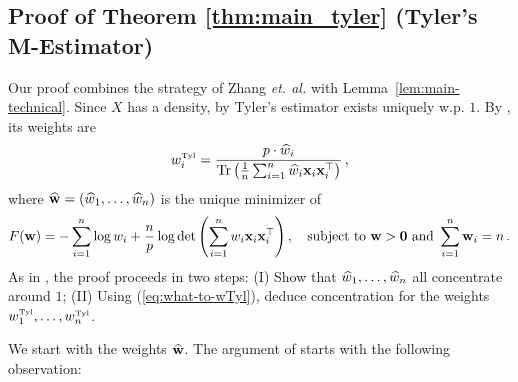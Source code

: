 \documentclass[times,sort&compress,3p]{elsarticle}
\begin{document}
   
\subsection{Proof of Theorem \ref{thm:main_tyler} (Tyler's M-Estimator)}
\label{sec:proof-Tyler}

Our proof combines the strategy of Zhang {\it et. al.} \cite{zhang2016marvcenko} with 
Lemma~\ref{lem:main-technical}.
Since $X$ has a density, by \cite[Theorems 1 and 2]{kent1988maximum} Tyler's estimator exists uniquely w.p. $1$. By \cite[Lemma 2.1]{zhang2016marvcenko}, its weights 
are
\begin{equation}\label{eq:what-to-wTyl}
    w^{\mbox{\tiny{Tyl}}}_i = \frac{p\cdot \widehat{w}_i}{\textrm{Tr} \left( \frac1n \sum_{i=1}^n \widehat{w}_i {\bf x}_i{\bf x}_i^\top  \right)}\,,
\end{equation}
where $\widehat{{\bf w}} = (\widehat{w}_1,\ldots,\widehat{w}_n)$ is the unique minimizer of 
\begin{equation}\label{eq:Tyl-what-objective}
    F({\bf w}) = -\sum_{i=1}^n \log w_i + \frac{n}{p}\log \det \left(\sum_{i=1}^n w_i {\bf x}_i{\bf x}_i^\top \right),\quad \textrm{subject to } {\bf w}>\bm{0}\textrm{ and }\sum_{i=1}^n {\bf w}_i=n \,.
\end{equation}
As in \cite{zhang2016marvcenko}, the proof proceeds in two steps: 
(I) Show that $\widehat{w}_1,\ldots,\widehat{w}_n$ all concentrate around $1$; (II) Using (\ref{eq:what-to-wTyl}), deduce concentration for the weights $w^{\mbox{\tiny{Tyl}}}_1,\ldots,w^{\mbox{\tiny{Tyl}}}_n$. 

We start with the weights $\widehat{{\bf w}}$. 
The argument of \cite[Section 3.2]{zhang2016marvcenko} starts with the following observation:
\end{document}
